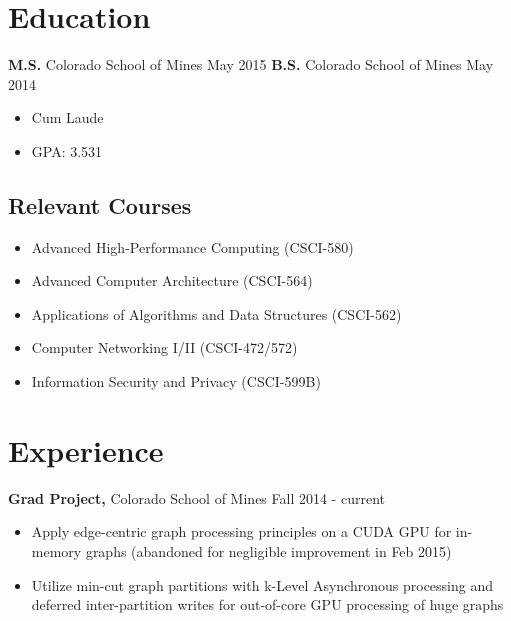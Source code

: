\documentclass[12pt]{res}
\begin{document}

\address{{\bf Contact Information} \\ (720) 219-7914 \\ gik0geck0@gmail.com}
\address{{\bf Online Presence} \\ https://github.com/gik0geck0 \\ https://bitbucket.org/gik0geck0 }

\begin{resume}

\section{Education}

{\bf M.S.} Colorado School of Mines \hfill May 2015
{\bf B.S.} Colorado School of Mines \hfill May 2014
\begin{itemize} \itemsep -2pt
    \item Cum Laude
    \item GPA: 3.531
\end{itemize}

\subsection{Relevant Courses}
\begin{itemize}
    \item Advanced High-Performance Computing (CSCI-580)
    \item Advanced Computer Architecture (CSCI-564)
    \item Applications of Algorithms and Data Structures (CSCI-562)
    \item Computer Networking I/II (CSCI-472/572)
    \item Information Security and Privacy (CSCI-599B)
\end{itemize}

\section{Experience}

{\bf Grad Project,} Colorado School of Mines \hfill Fall 2014 - current
\begin{itemize} \itemsep -2pt
    \item Apply edge-centric graph processing principles on a CUDA GPU for in-memory graphs (abandoned for negligible improvement in Feb 2015)
    \item Utilize min-cut graph partitions with k-Level Asynchronous processing and deferred inter-partition writes for out-of-core GPU processing of huge graphs
\end{itemize}


\end{resume}
\end{document}
